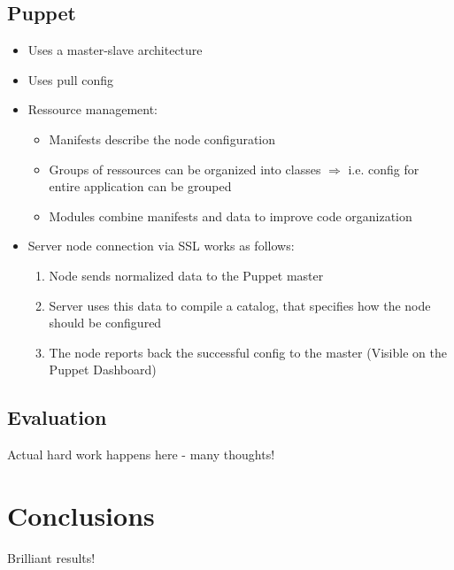 \subsection{Puppet}
	\begin{itemize}
		\item Uses a master-slave architecture
		\item Uses pull config
		\item Ressource management:
		\begin{itemize}
			\item Manifests describe the node configuration
			\item Groups of ressources can be organized into classes $\Rightarrow$ i.e. config for entire application can be grouped
			\item Modules combine manifests and data to improve code organization
		\end{itemize}
		\item Server node connection via SSL works as follows:
		\begin{enumerate}
			\item Node sends normalized data to the Puppet master
			\item Server uses this data to compile a catalog, that specifies how the node should be configured
			\item The node reports back the successful config to the master (Visible on the Puppet Dashboard)
		\end{enumerate}
	\end{itemize}

\subsection{Evaluation}

Actual hard work happens here - many thoughts!


\section{Conclusions}

Brilliant results!

